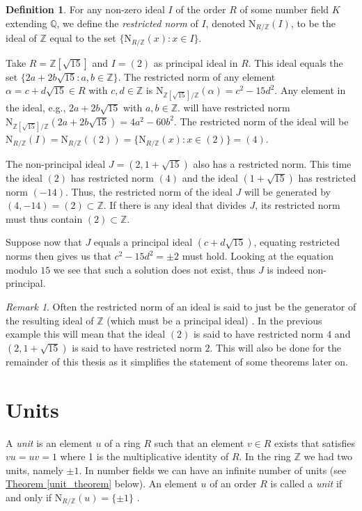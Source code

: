\documentclass[openany, a4paper, 10pt]{book}
\theoremstyle{plain}
\theoremstyle{plain}
\theoremstyle{plain}
\theoremstyle{definition}
\newtheorem{definition}[theorem]{Definition}
\theoremstyle{plain}
\theoremstyle{definition}
\theoremstyle{remark}
\newtheorem*{remark}{Remark}
\newcommand{\theoref}[1]{\hyperref[#1]{Theorem \ref{#1}}}
\begin{document}
\begin{definition}
    For any non-zero ideal $I$ of the order $R$ of some number field $K$ extending $\mathbb Q$, we define the \textit{restricted norm} of $I$, denoted $\mathrm{N}_{R/\mathbb Z}(I)$, to be the ideal of $\mathbb Z$ equal to the set $\{ \mathrm{N}_{R/\mathbb Z}(x): x \in I \}$.
\end{definition}
\begin{examplebox}[label={non_principal}, nameref={following example}]
    Take $R = \mathbb Z[\sqrt{15}]$ and $I = (2)$ as principal ideal in $R$.
    This ideal equals the set
    $\{ 2a + 2b \sqrt{15}: a, b \in \mathbb Z \}$.
    The restricted norm of any element $\alpha=c+d\sqrt{15}\in R$ with $c,d \in \mathbb Z$ is $\mathrm{N}_{\mathbb Z[\sqrt{15}]/ \mathbb Z}(\alpha) = c^2-15d^2$.
    Any element in the ideal, e.g., $2a + 2b\sqrt{15}$ with $a,b \in \mathbb Z$.
    will have restricted norm $\mathrm{N}_{\mathbb Z[\sqrt{15}]/ \mathbb Z}(2a + 2b\sqrt{15}) = 4a^2 - 60b^2$.
    The restricted norm of the ideal will be $\mathrm{N}_{R/\mathbb Z}(I) = \mathrm{N}_{R/\mathbb Z}((2)) = \{ \mathrm{N}_{R/\mathbb Z}(x): x \in (2)\} = (4)$.


    The non-principal ideal $J = (2, 1+\sqrt{15})$ also has a restricted norm.
    This time the ideal $(2)$ has restricted norm $(4)$
    and the ideal $(1+\sqrt{15})$ has restricted norm $(-14)$.
    Thus, the restricted norm of the ideal $J$ will be generated by $(4,-14) = (2) \subset \mathbb Z$.
    If there is any ideal that divides $J$, its restricted norm must thus contain $(2) \subset \mathbb Z$.

    Suppose now that $J$ equals a principal ideal $(c+d\sqrt{15})$, equating restricted norms then gives us that $c^2-15d^2 = \pm 2$ must hold.
    Looking at the equation modulo $15$ we see that such a solution does not exist, thus $J$ is indeed non-principal.
\end{examplebox}
\begin{remark}
    Often the restricted norm of an ideal is said to just be the generator of the resulting ideal of $\mathbb Z$ (which must be a principal ideal) \cite[Section~I.8]{janusz}.
    In the previous example this will mean that the ideal $(2)$ is said to have restricted norm $4$ and $(2, 1+\sqrt{15})$ is said to have restricted norm $2$.
    This will also be done for the remainder of this thesis as it simplifies the statement of some theorems later on.
\end{remark}


\section{Units}\label{sec:units}
A \textit{unit} is an element $u$ of a ring $R$ such that an element $v \in R$ exists that satisfies $vu = uv = 1$ where 1 is the multiplicative identity of $R$.
In the ring $\mathbb Z$ we had two units, namely $\pm 1$.
In number fields we can have an infinite number of units (see \theoref{unit_theorem} below).
An element $u$ of an order $R$ is called a \textit{unit} if and only if $\mathrm{N}_{R/\mathbb Z}(u) = \{ \pm 1\}$ \cite[p.~16]{marcus}.
\end{document}
